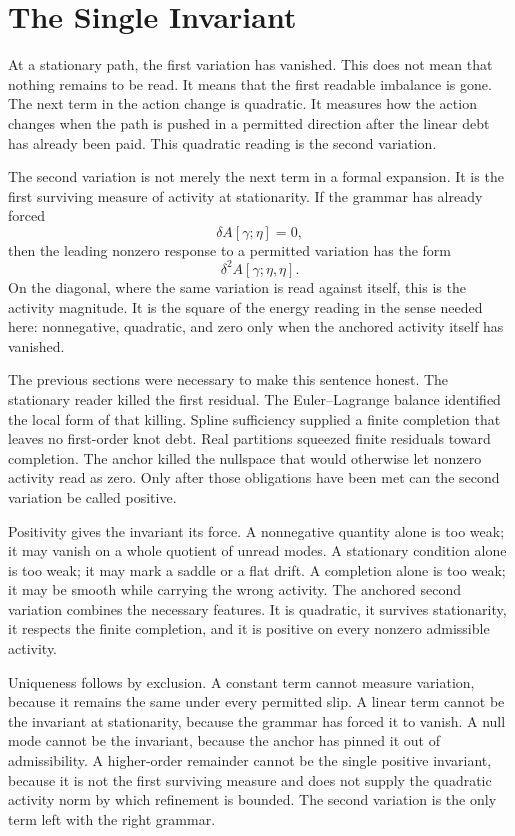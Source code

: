 \section{The Single Invariant}

At a stationary path, the first variation has vanished. This does not mean
that nothing remains to be read. It means that the first readable imbalance
is gone. The next term in the action change is quadratic. It measures how
the action changes when the path is pushed in a permitted direction after
the linear debt has already been paid. This quadratic reading is the second
variation.

The second variation is not merely the next term in a formal expansion. It
is the first surviving measure of activity at stationarity. If the grammar
has already forced
\[
  \delta A[\gamma;\eta] = 0 ,
\]
then the leading nonzero response to a permitted variation has the form
\[
  \delta^2 A[\gamma;\eta,\eta].
\]
On the diagonal, where the same variation is read against itself, this is
the activity magnitude. It is the square of the energy reading in the sense
needed here: nonnegative, quadratic, and zero only when the anchored
activity itself has vanished.

The previous sections were necessary to make this sentence honest. The
stationary reader killed the first residual. The Euler--Lagrange balance
identified the local form of that killing. Spline sufficiency supplied a
finite completion that leaves no first-order knot debt. Real partitions
squeezed finite residuals toward completion. The anchor killed the nullspace
that would otherwise let nonzero activity read as zero. Only after those
obligations have been met can the second variation be called positive.

Positivity gives the invariant its force. A nonnegative quantity alone is
too weak; it may vanish on a whole quotient of unread modes. A stationary
condition alone is too weak; it may mark a saddle or a flat drift. A
completion alone is too weak; it may be smooth while carrying the wrong
activity. The anchored second variation combines the necessary features. It
is quadratic, it survives stationarity, it respects the finite completion,
and it is positive on every nonzero admissible activity.

Uniqueness follows by exclusion. A constant term cannot measure variation,
because it remains the same under every permitted slip. A linear term cannot
be the invariant at stationarity, because the grammar has forced it to
vanish. A null mode cannot be the invariant, because the anchor has pinned
it out of admissibility. A higher-order remainder cannot be the single
positive invariant, because it is not the first surviving measure and does
not supply the quadratic activity norm by which refinement is bounded. The
second variation is the only term left with the right grammar.

